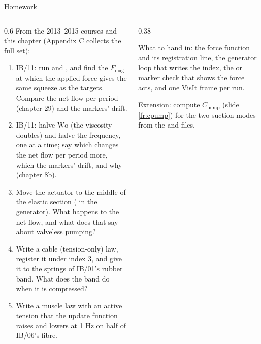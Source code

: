 \documentclass[aspectratio=169,11pt]{beamer}
\begin{document}
\begin{frame}{Homework}
\label{fr:hw}
\begin{columns}[T,onlytextwidth]
\begin{column}{0.6\textwidth}
\footnotesize From the 2013--2015 courses and this chapter (Appendix C collects the full set):
\begin{enumerate}
  \item IB/11: run  and , and find the $F_{\mathrm{mag}}$ at which the applied force gives the same squeeze as the targets. Compare the net flow per period (chapter 29) and the markers' drift.
  \item IB/11: halve $\mathrm{Wo}$ (the viscosity doubles) and halve the frequency, one at a time; say which changes the net flow per period more, which the markers' drift, and why (chapter 8b).
  \item Move the actuator to the middle of the elastic section ( in the generator). What happens to the net flow, and what does that say about valveless pumping?
  \item Write a cable (tension-only) law, register it under index 3, and give it to the springs of IB/01's rubber band. What does the band do when it is compressed?
  \item Write a muscle law with an active tension that the update function raises and lowers at 1 Hz on half of IB/06's fibre.
\end{enumerate}
\end{column}
\begin{column}{0.38\textwidth}
\begin{punchbox}
\scriptsize What to hand in: the force function and its registration line, the generator loop that writes the index, the  or marker check that shows the force acts, and one VisIt frame per run.
\end{punchbox}
\scriptsize Extension: compute $C_{\mathrm{pump}}$ (slide \ref{fr:cpump}) for the two suction modes from the  and  files.
\end{column}
\end{columns}
\end{frame}
\end{document}

